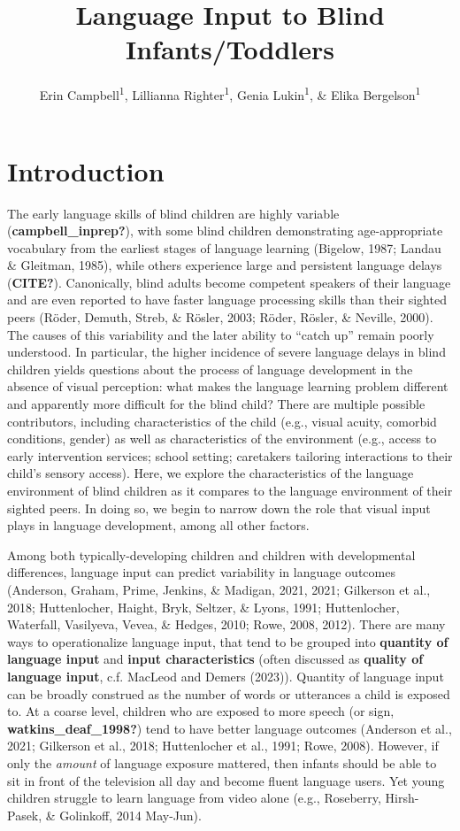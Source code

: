 \documentclass[
  man,floatsintext]{apa6}
\title{Language Input to Blind Infants/Toddlers}
\author{Erin Campbell\textsuperscript{1}, Lillianna Righter\textsuperscript{1}, Genia Lukin\textsuperscript{1}, \& Elika Bergelson\textsuperscript{1}}
\date{}
\affiliation{\vspace{0.5cm}\textsuperscript{1} Department of Psychology \& Neuroscience, Duke University, Durham, NC}
\begin{document}
\maketitle

\hypertarget{introduction}{%
\section{Introduction}\label{introduction}}

The early language skills of blind children are highly variable (\textbf{campbell\_inprep?}), with some blind children demonstrating age-appropriate vocabulary from the earliest stages of language learning (Bigelow, 1987; Landau \& Gleitman, 1985), while others experience large and persistent language delays (\textbf{CITE?}). Canonically, blind adults become competent speakers of their language and are even reported to have faster language processing skills than their sighted peers (Röder, Demuth, Streb, \& Rösler, 2003; Röder, Rösler, \& Neville, 2000). The causes of this variability and the later ability to ``catch up'' remain poorly understood. In particular, the higher incidence of severe language delays in blind children yields questions about the process of language development in the absence of visual perception: what makes the language learning problem different and apparently more difficult for the blind child? There are multiple possible contributors, including characteristics of the child (e.g., visual acuity, comorbid conditions, gender) as well as characteristics of the environment (e.g., access to early intervention services; school setting; caretakers tailoring interactions to their child's sensory access). Here, we explore the characteristics of the language environment of blind children as it compares to the language environment of their sighted peers. In doing so, we begin to narrow down the role that visual input plays in language development, among all other factors.

Among both typically-developing children and children with developmental differences, language input can predict variability in language outcomes (Anderson, Graham, Prime, Jenkins, \& Madigan, 2021, 2021; Gilkerson et al., 2018; Huttenlocher, Haight, Bryk, Seltzer, \& Lyons, 1991; Huttenlocher, Waterfall, Vasilyeva, Vevea, \& Hedges, 2010; Rowe, 2008, 2012). There are many ways to operationalize language input, that tend to be grouped into \textbf{quantity of language input} and \textbf{input characteristics} (often discussed as \textbf{quality of language input}, c.f. MacLeod and Demers (2023)). Quantity of language input can be broadly construed as the number of words or utterances a child is exposed to. At a coarse level, children who are exposed to more speech (or sign, \textbf{watkins\_deaf\_1998?}) tend to have better language outcomes (Anderson et al., 2021; Gilkerson et al., 2018; Huttenlocher et al., 1991; Rowe, 2008). However, if only the \emph{amount} of language exposure mattered, then infants should be able to sit in front of the television all day and become fluent language users. Yet young children struggle to learn language from video alone (e.g., Roseberry, Hirsh-Pasek, \& Golinkoff, 2014 May-Jun).
\end{document}
